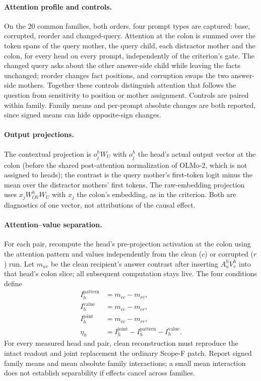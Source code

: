 \paragraph{Attention profile and controls.}
On the 20 common families, both orders, four prompt types are captured: base,
corrupted, reorder and changed-query. Attention at the colon is summed over the
token spans of the query mother, the query child, each distractor mother and the
colon, for every head on every prompt, independently of the criterion's gate.
The changed query asks about the other answer-side child while leaving the facts
unchanged; reorder changes fact positions, and corruption swaps the two answer-side
mothers. Together these controls distinguish attention that follows the question
from sensitivity to position or mother assignment. Controls are paired within
family. Family means and per-prompt absolute changes are
both reported, since signed means can hide opposite-sign changes.

\paragraph{Output projections.}
The contextual projection is $o^h_jW_U$ with $o^h_j$ the head's actual output
vector at the colon (before the shared post-attention normalization of OLMo-2,
which is not assigned to heads); the contrast is the query mother's first-token
logit minus the mean over the distractor mothers' first tokens. The raw-embedding
projection uses $x_jW^h_{OV}W_U$ with $x_j$ the colon's embedding, as in the
criterion. Both are diagnostics of one vector, not attributions of the causal
effect.

\paragraph{Attention--value separation.}
For each pair, recompute the head's pre-projection activation at the colon using
the attention pattern and values independently from the clean ($c$) or corrupted
($r$) run. Let $m_{uv}$ be the clean recipient's answer contrast after inserting
$A_u^hV_v^h$ into that head's colon slice; all subsequent computation stays live.
The four conditions define
\begin{align*}
I_h^{\mathrm{pattern}}&=m_{cc}-m_{rc},\\
I_h^{\mathrm{value}}&=m_{cc}-m_{cr},\\
I_h^{\mathrm{joint}}&=m_{cc}-m_{rr},\\
\eta_h&=I_h^{\mathrm{joint}}-I_h^{\mathrm{pattern}}-I_h^{\mathrm{value}}.
\end{align*}
For every measured head and pair, clean reconstruction must reproduce the intact
readout and joint replacement the ordinary Scope-F patch. Report signed family
means and mean absolute family interactions; a small mean interaction does not
establish separability if effects cancel across families.

